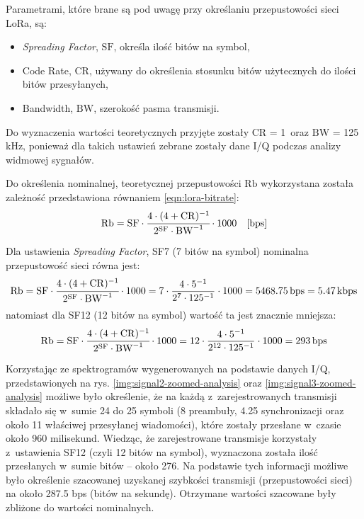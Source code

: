 Parametrami, które brane są pod uwagę przy określaniu przepustowości sieci LoRa, są:
\begin{itemize}[label=--]
    \item \textsl{Spreading Factor}, $\mathrm{SF}$, określa ilość bitów na symbol,
    \item Code Rate, $\mathrm{CR}$, używany do określenia stosunku bitów użytecznych do ilości bitów przesyłanych,
    \item Bandwidth, $\mathrm{BW}$, szerokość pasma transmisji.
\end{itemize}
Do wyznaczenia wartości teoretycznych przyjęte zostały $\mathrm{CR}$ = 1~oraz $\mathrm{BW}$ = 125 kHz, ponieważ dla
takich ustawień zebrane zostały dane I/Q podczas analizy widmowej sygnałów.

Do określenia nominalnej, teoretycznej przepustowości $\mathrm{Rb}$ wykorzystana została zależność przedstawiona
równaniem \ref{eqn:lora-bitrate}:
\begin{equation}\label{eqn:lora-bitrate}
    \mathrm{Rb} = \mathrm{SF}\cdot\cfrac{4\cdot{(4+\mathrm{CR})^{-1}}}{2^{\mathrm{SF}}\cdot{\mathrm{BW}^{-1}}}\cdot{1000}\quad\text{[bps]}
\end{equation}

Dla ustawienia \textsl{Spreading Factor}, SF7 (7 bitów na symbol) nominalna przepustowość sieci równa jest:
\begin{equation*}
    \mathrm{Rb} = \mathrm{SF}\cdot\cfrac{4\cdot{(4+\mathrm{CR})^{-1}}}{2^{\mathrm{SF}}\cdot{\mathrm{BW}^{-1}}}\cdot{1000} = 7 \cdot \frac{4 \cdot 5^{-1}}{2^7\cdot 125^{-1}} \cdot 1000 = 5468.75\,\text{bps} = 5.47\,\text{kbps}
\end{equation*}
natomiast dla SF12 (12 bitów na symbol) wartość ta jest znacznie mniejsza:
\begin{equation*}
    \mathrm{Rb} = \mathrm{SF}\cdot\cfrac{4\cdot{(4+\mathrm{CR})^{-1}}}{2^{\mathrm{SF}}\cdot{\mathrm{BW}^{-1}}}\cdot{1000} = 12 \cdot \frac{4 \cdot 5^{-1}}{2^{12}\cdot 125^{-1}} \cdot 1000 = 293\,\text{bps}
\end{equation*}

Korzystając ze spektrogramów wygenerowanych na podstawie danych I/Q, przedstawionych na rys.
\ref{img:signal2-zoomed-analysis} oraz \ref{img:signal3-zoomed-analysis} możliwe było określenie, że na każdą
z~zarejestrowanych transmisji składało się w~sumie 24 do 25 symboli (8 preambuły, 4.25 synchronizacji oraz około 11
właściwej przesyłanej wiadomości), które zostały przesłane w~czasie około 960 milisekund. Wiedząc, że zarejestrowane
transmisje korzystały z~ustawienia SF12 (czyli 12 bitów na symbol), wyznaczona została ilość przesłanych w~sumie bitów
-- około 276. Na podstawie tych informacji możliwe było określenie szacowanej uzyskanej szybkości transmisji
(przepustowości sieci) na około 287.5 bps (bitów na sekundę). Otrzymane wartości szacowane były zbliżone do wartości
nominalnych.

